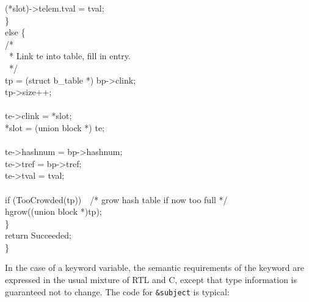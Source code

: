 {\>\>(*slot)->telem.tval = tval;\\
\>\>\}\\
\>else \{\\
\>\>/*\\
\>\>\ * Link te into table, fill in entry.\\
\>\>\ */\\
\>\>tp = (struct b\_table *) bp->clink;\\
\>\>tp->size++;\\
\\
\>\>te->clink = *slot;\\
\>\>*slot = (union block *) te;\\
\\
\>\>te->hashnum = bp->hashnum;\\
\>\>te->tref = bp->tref;\\
\>\>te->tval = tval;\\
\\
\>\>if (TooCrowded(tp))\ \ /* grow hash table if now too full */\\
\>\>\>hgrow((union block *)tp);\\
\>\>\}\\
\>return Succeeded;\\
\}
}

In the case of a keyword variable, the semantic requirements
of the keyword are expressed in the usual mixture of RTL and C, except
that type information is guaranteed not to change. The code for
\texttt{\&subject} is typical:

\goodbreak
{}

